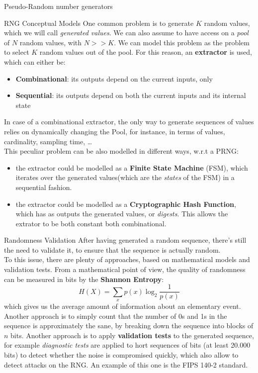 \begin{section}{Pseudo-Random number generators}
  \begin{subsection}{RNG Conceptual Models}
    One common problem is to generate $K$ random values, which we will call \textit{generated
    values}. We can also assume to have access on a \textit{pool} of $N$ random values, with $N>>K$.
    We can model this problem as the problem to select $K$ random values out of the pool. For this
    reason, an \textbf{extractor} is used, which can either be:
    \begin{itemize}
      \item \textbf{Combinational}: its outputs depend on the current inputs, only
      \item \textbf{Sequential}: its outputs depend on both the current inputs and its internal
        state
    \end{itemize}
    In case of a combinational extractor, the only way to generate sequences of values relies on
    dynamically changing the Pool, for instance, in terms of values, cardinality, sampling time,
    \dots\\
    This peculiar problem can be also modelled in different ways, w.r.t a PRNG:
    \begin{itemize}
      \item the extractor could be modelled as a \textbf{Finite State Machine} (FSM), which iterates
        over the generated values(which are the \textit{states} of the FSM) in a sequential fashion.
      \item the extractor could be modelled as a \textbf{Cryptographic Hash Function}, which has as
        outputs the generated values, or \textit{digests}. This allows the extrator to be both
        constant both combinational.
    \end{itemize}
  \end{subsection}
  \begin{subsection}{Randomness Validation}
    After having generated a random sequence, there's still the need to validate it, to ensure that
    the sequence is actually random.\\
    To this issue, there are plenty of approaches, based on mathematical models and validation
    tests. From a mathematical point of view, the quality of randomness can be measured in bits by
    the \textbf{Shannon Entropy}:
    \begin{equation}
      H(X) = \sum_{x} p(x) \log_2 \frac{1}{p(x)}
    \end{equation}
    which gives us the average amount of information about an elementary event.\\
    Another approach is to simply count that the number of 0s and 1s in the sequence is
    approximately the sane, by breaking down the sequence into blocks of $n$ bits.
    Another approach is to apply \textbf{validation tests} to the generated sequence, for example
    \textit{diagnostic tests} are applied to hort sequences of bits (at least 20.000 bits) to detect
    whether the noise is compromised quickly, which also allow to detect attacks on the RNG. An
    example of this one is the FIPS 140-2 standard.
  \end{subsection}

\end{section}

